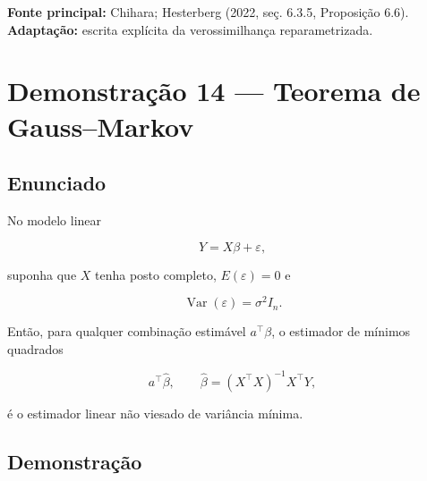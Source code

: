 \documentclass[
  letterpaper,
  DIV=11,
  numbers=noendperiod]{scrreprt}
\begin{document}
\begin{tcolorbox}[enhanced jigsaw, colback=white, leftrule=.75mm, colbacktitle=quarto-callout-note-color!10!white, breakable, titlerule=0mm, bottomtitle=1mm, title=\textcolor{quarto-callout-note-color}{\faInfo}\hspace{0.5em}{Fonte da demonstração}, colframe=quarto-callout-note-color-frame, toprule=.15mm, opacityback=0, bottomrule=.15mm, opacitybacktitle=0.6, arc=.35mm, toptitle=1mm, rightrule=.15mm, coltitle=black, left=2mm]

\textbf{Fonte principal:} Chihara; Hesterberg (2022, seç. 6.3.5,
Proposição 6.6).\\
\textbf{Adaptação:} escrita explícita da verossimilhança
reparametrizada.

\end{tcolorbox}

\section*{Demonstração 14 --- Teorema de
Gauss--Markov}\label{demonstrauxe7uxe3o-14-teorema-de-gaussmarkov}


\subsection*{Enunciado}\label{enunciado-10}

No modelo linear

\[
Y=X\beta+\varepsilon,
\]

suponha que \(X\) tenha posto completo, \(E(\varepsilon)=0\) e

\[
\operatorname{Var}(\varepsilon)=\sigma^2I_n.
\]

Então, para qualquer combinação estimável \(a^\top\beta\), o estimador
de mínimos quadrados

\[
a^\top\widehat\beta,
\qquad
\widehat\beta=(X^\top X)^{-1}X^\top Y,
\]

é o estimador linear não viesado de variância mínima.

\subsection*{Demonstração}\label{demonstrauxe7uxe3o-11}
\end{document}
